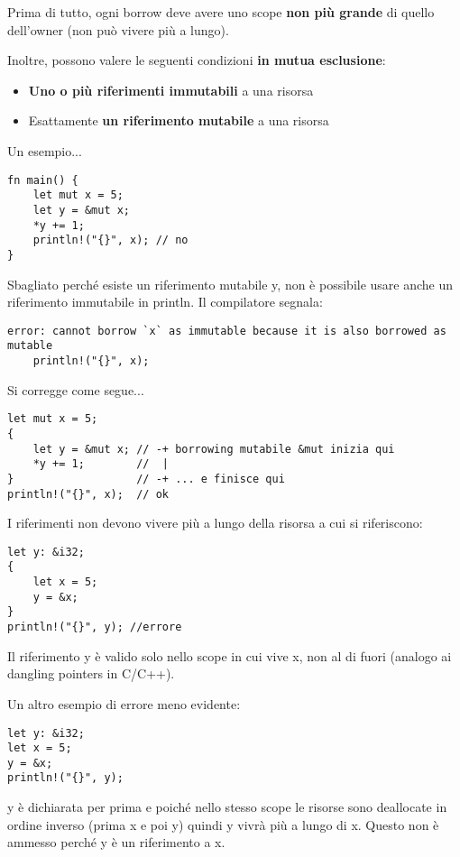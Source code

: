 Prima di tutto, ogni borrow deve avere uno scope \textbf{non più grande} di
quello dell’owner (non può vivere più a lungo).

Inoltre, possono valere le seguenti condizioni \textbf{in mutua esclusione}:

\begin{itemize}
\item \textbf{Uno o più riferimenti immutabili} a una risorsa
\item Esattamente \textbf{un riferimento mutabile} a una risorsa
\end{itemize}

Un esempio...

\begin{lstlisting}
fn main() {
    let mut x = 5;
    let y = &mut x;
    *y += 1;
    println!("{}", x); // no
}
\end{lstlisting}

Sbagliato perché esiste un riferimento mutabile y, non è possibile usare anche
un riferimento immutabile in println. Il compilatore segnala:

\begin{lstlisting}
error: cannot borrow `x` as immutable because it is also borrowed as mutable
    println!("{}", x);
\end{lstlisting}

Si corregge come segue...

\begin{lstlisting}
let mut x = 5;
{
    let y = &mut x; // -+ borrowing mutabile &mut inizia qui
    *y += 1;        //  |
}                   // -+ ... e finisce qui
println!("{}", x);  // ok
\end{lstlisting}

I riferimenti non devono vivere più a lungo della risorsa a cui si riferiscono:

\begin{lstlisting}
let y: &i32;
{
    let x = 5;
    y = &x;
}
println!("{}", y); //errore
\end{lstlisting}

Il riferimento y è valido solo nello scope in cui vive x, non al di fuori
(analogo ai dangling pointers in C/C++).

Un altro esempio di errore meno evidente:

\begin{lstlisting}
let y: &i32;
let x = 5;
y = &x;
println!("{}", y);
\end{lstlisting}

y è dichiarata per prima e poiché nello stesso scope le risorse sono deallocate
in ordine inverso (prima x e poi y) quindi y vivrà più a lungo di x.
Questo non è ammesso perché y è un riferimento a x.
